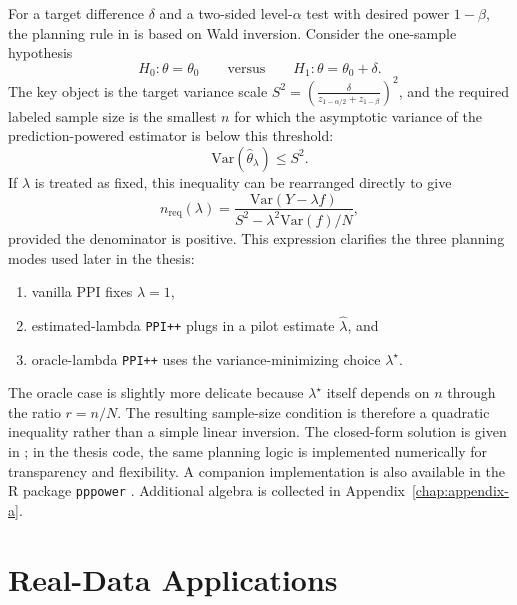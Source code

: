 For a target difference $\delta$ and a two-sided level-$\alpha$ test with desired power $1-\beta$, the planning rule in \textcite{ppi_power} is based on Wald inversion. Consider the one-sample hypothesis
\[
H_0:\theta=\theta_0
\qquad\text{versus}\qquad
H_1:\theta=\theta_0+\delta.
\]
The key object is the target variance scale \(S^2 = \left( \frac{\delta}{z_{1-\alpha/2} + z_{1-\beta}} \right)^2\), and the required labeled sample size is the smallest \(n\) for which the asymptotic variance of the prediction-powered estimator is below this threshold:
\[
\mathrm{Var}(\widehat{\theta}_{\lambda}) \le S^2.
\]
If $\lambda$ is treated as fixed, this inequality can be rearranged directly to give
\begin{equation}
n_{\mathrm{req}}(\lambda)
=
\frac{\mathrm{Var}(Y-\lambda f)}
{S^2-\lambda^2\mathrm{Var}(f)/N},
\label{eq:n_req_lambda}
\end{equation}
provided the denominator is positive. This expression clarifies the three planning modes used later in the thesis:
\begin{enumerate}
    \item vanilla PPI fixes $\lambda=1$,
    \item estimated-lambda \texttt{PPI++} plugs in a pilot estimate $\widehat{\lambda}$, and
    \item oracle-lambda \texttt{PPI++} uses the variance-minimizing choice $\lambda^\star$.
\end{enumerate}
The oracle case is slightly more delicate because $\lambda^\star$ itself depends on $n$ through the ratio $r=n/N$. The resulting sample-size condition is therefore a quadratic inequality rather than a simple linear inversion. The closed-form solution is given in \textcite{ppi_power}; in the thesis code, the same planning logic is implemented numerically for transparency and flexibility. A companion implementation is also available in the R package \texttt{pppower} \parencite{pppower_pkg}. Additional algebra is collected in Appendix~\ref{chap:appendix-a}.

\section{Real-Data Applications}

